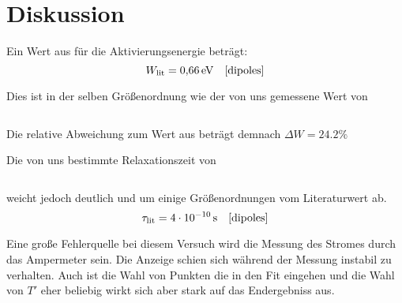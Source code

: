 \section{Diskussion}\label{sec:Diskussion}


Ein Wert aus \cite{dipoles} für die Aktivierungsenergie beträgt:
\begin{equation}
  W_\text{lit} = \SI{0.66}{\electronvolt} \quad \text{\cite{dipoles}}
\end{equation}

Dies ist in der selben Größenordnung wie der von uns gemessene Wert von

\begin{equation}
  
\end{equation}

Die relative Abweichung zum Wert aus \cite{dipoles} beträgt demnach $\Delta W = 24.2 \%$



Die von uns bestimmte Relaxationszeit von

\begin{equation}
  
\end{equation}

 weicht jedoch deutlich und um einige Größenordnungen vom Literaturwert ab.
\begin{equation}
  \tau_\text{lit} = \SI{4E-10}{\second} \quad \text{\cite{dipoles}}
\end{equation}



Eine große Fehlerquelle bei diesem Versuch wird die Messung des Stromes durch das
Ampermeter sein. Die Anzeige schien sich während der Messung instabil zu verhalten.
Auch ist die Wahl von Punkten die in den Fit eingehen und die Wahl von $T'$ eher beliebig
wirkt sich aber stark auf das Endergebniss aus.
